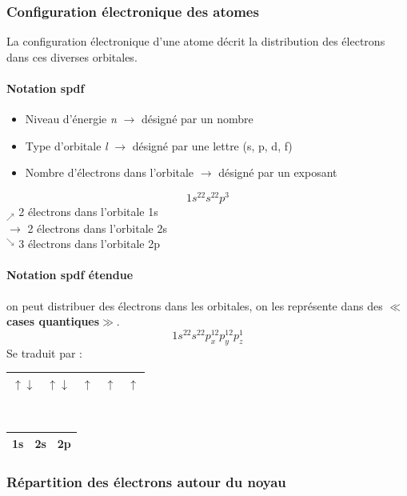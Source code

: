 \documentclass[10pt,a4paper]{book}
\begin{document}
\subsubsection{Configuration électronique des atomes}

La configuration électronique d'une atome décrit la distribution des électrons dans ces diverses orbitales.
\paragraph{Notation spdf}
\begin{itemize}
\item Niveau d'énergie \textit{n} $\rightarrow$ désigné par un nombre
\item Type d'orbitale \textit{l} $\rightarrow$ désigné par une lettre (s, p, d, f)
\item Nombre d'électrons dans l'orbitale $\rightarrow$ désigné par un exposant
\end{itemize}
\begin{displaymath}
1s^22s^22p^3
\end{displaymath}
$_\nearrow$ 2 électrons dans l'orbitale 1s \\
$\rightarrow$ 2 électrons dans l'orbitale 2s \\
$^\searrow$ 3 électrons dans l'orbitale 2p 
\paragraph{Notation spdf étendue} on peut distribuer des électrons dans les orbitales, on les représente dans des $\ll$\textbf{cases quantiques}$\gg$.
\begin{displaymath}
1s^22s^22p_x^12p_y^12p_z^1
\end{displaymath}
Se traduit par :
\begin{center}
\begin{tabular}{| c | c | c | c | c |}
\hline
$\uparrow\downarrow$ & $\uparrow\downarrow$ & $\uparrow$ & $\uparrow$  & $\uparrow$ \\
\hline
\end{tabular} \\
\begin{tabular}{| c | c | m{1.5cm}|}
\hline
1s & 2s & 2p \\
\hline
\end{tabular}
\end{center}

\subsubsection{Répartition des électrons autour du noyau}
\end{document}
